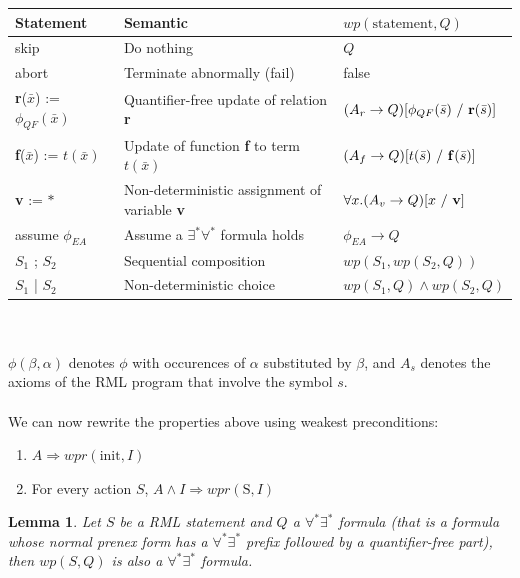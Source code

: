 \documentclass[11pt,a4paper,oldfontcommands,openany]{memoir}
\newtheorem*{lemma}{Lemma}
\begin{document}
    \begin{tabular}{|l|l|l|}
        \hline
        Statement & Semantic & \( wp(\text{statement},Q) \) \\
        \hline
        skip & Do nothing & \(Q\) \\
        abort & Terminate abnormally (fail) & false \\
        \textbf{r}(\(\bar{x}\)) := \( \phi_{QF}(\bar{x}) \) & Quantifier-free update of relation \textbf{r} & \((A_r \rightarrow Q) [\phi_{QF}(\bar{s})\ /\ \text{\textbf{r}}(\bar{s})]\) \\
        \textbf{f}(\(\bar{x}\)) := \( t(\bar{x}) \) & Update of function \textbf{f} to term \( t(\bar{x}) \) & \((A_f \rightarrow Q) [t(\bar{s})\ /\ \text{\textbf{f}}(\bar{s})]\) \\
        \textbf{v} := \( * \) & Non-deterministic assignment of variable \textbf{v} & \(\forall x. (A_v \rightarrow Q) [x\ /\ \text{\textbf{v}}]\)\\
        assume \( \phi_{EA} \) & Assume a \( \exists^*\forall^* \) formula holds & \( \phi_{EA} \rightarrow Q \) \\
        \( S_1 \) ; \( S_2 \) & Sequential composition & \( wp(S_1, wp(S_2, Q)) \) \\
        \( S_1 \) | \( S_2 \) & Non-deterministic choice & \( wp(S_1, Q) \land wp(S_2, Q) \) \\
        \hline
    \end{tabular}\\ \\
    \( \phi(\beta,\alpha) \) denotes \(\phi\) with occurences of \(\alpha\) substituted by \(\beta\), and \(A_s\) denotes the axioms of the RML program
    that involve the symbol \(s\).\\
    \\
    We can now rewrite the properties above using weakest preconditions:
    \begin{enumerate}
        \item \(A \Rightarrow wpr(\text{init},I)\)
        \item For every action \(S\), \(A \land I \Rightarrow wpr(\text{S},I)\)
    \end{enumerate}

    \begin{lemma}
        Let \(S\) be a RML statement and \(Q\) a \(\forall^*\exists^*\) formula (that is a formula whose normal prenex form has a \(\forall^*\exists^*\) prefix followed by a quantifier-free part), then \(wp(S,Q)\) is also a \(\forall^*\exists^*\) formula.
    \end{lemma}
\end{document}

